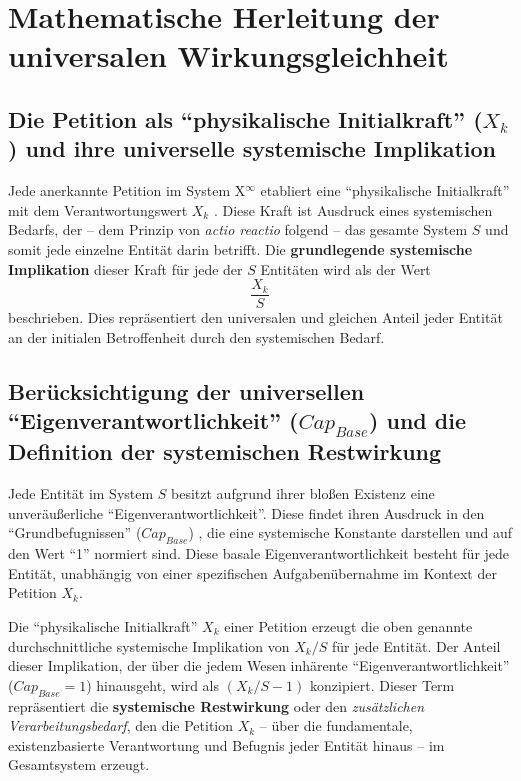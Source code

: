 \documentclass[12pt]{scrartcl}
\begin{document}
\section{Mathematische Herleitung der universalen Wirkungsgleichheit}
\subsection{Die Petition als \enquote{physikalische Initialkraft} ($X_k$) und ihre universelle systemische Implikation}
Jede anerkannte Petition im System X$^\infty$ etabliert eine \enquote{physikalische Initialkraft} mit dem Verantwortungswert $X_k$ \cite{Auctor:Zenodo15385150}. Diese Kraft ist Ausdruck eines systemischen Bedarfs, der – dem Prinzip von \textit{actio reactio} folgend \cite{Auctor:Zenodo15385150} – das gesamte System $S$ und somit jede einzelne Entität darin betrifft. Die \textbf{grundlegende systemische Implikation} dieser Kraft für jede der $S$ Entitäten wird als der Wert
\begin{equation}
\frac{X_k}{S}
\end{equation}
beschrieben. Dies repräsentiert den universalen und gleichen Anteil jeder Entität an der initialen Betroffenheit durch den systemischen Bedarf.

\subsection{Berücksichtigung der universellen \enquote{Eigenverantwortlichkeit} ($Cap_{Base}$) und die Definition der systemischen Restwirkung}
Jede Entität im System $S$ besitzt aufgrund ihrer bloßen Existenz eine unveräußerliche \enquote{Eigenverantwortlichkeit}. Diese findet ihren Ausdruck in den \enquote{Grundbefugnissen} ($Cap_{Base}$) \cite{Auctor:Zenodo15385150}, die eine systemische Konstante darstellen und auf den Wert \enquote{1} normiert sind. Diese basale Eigenverantwortlichkeit besteht für jede Entität, unabhängig von einer spezifischen Aufgabenübernahme im Kontext der Petition $X_k$.

Die \enquote{physikalische Initialkraft} $X_k$ einer Petition erzeugt die oben genannte durchschnittliche systemische Implikation von $X_k/S$ für jede Entität. Der Anteil dieser Implikation, der über die jedem Wesen inhärente \enquote{Eigenverantwortlichkeit} ($Cap_{Base}=1$) hinausgeht, wird als $(X_k/S - 1)$ konzipiert. Dieser Term repräsentiert die \textbf{systemische Restwirkung} oder den \textit{zusätzlichen Verarbeitungsbedarf}, den die Petition $X_k$ – über die fundamentale, existenzbasierte Verantwortung und Befugnis jeder Entität hinaus – im Gesamtsystem erzeugt.
\end{document}
